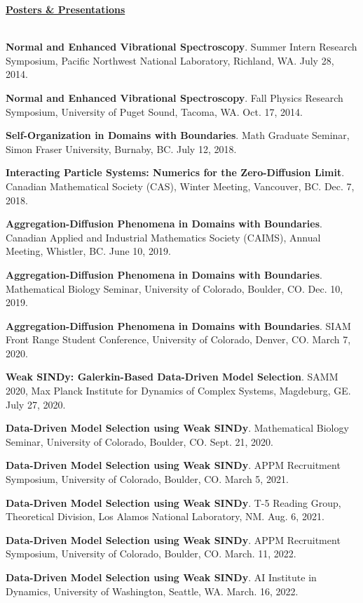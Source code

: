 \documentclass[letterpaper,11pt,oneside]{article}
\newcommand{\headr}[1]{\vspace{10pt}\uline{\Large{\textbf{#1}} \hfill } \\ \vspace{-10pt}\\}
\begin{document}
\headr{Posters \& Presentations}

\begin{enumerate}[label={[\arabic*]}]
\item \textbf{Normal and Enhanced Vibrational Spectroscopy}. Summer Intern Research Symposium, Pacific Northwest National Laboratory, Richland, WA. July 28, 2014.
\item \textbf{Normal and Enhanced Vibrational Spectroscopy}. Fall Physics Research Symposium, University of Puget Sound, Tacoma, WA. Oct. 17, 2014.
\item \textbf{Self-Organization in Domains with Boundaries}. Math Graduate Seminar, Simon Fraser University, Burnaby, BC. July 12, 2018.
\item \textbf{Interacting Particle Systems: Numerics for the Zero-Diffusion Limit}. Canadian Mathematical Society (CAS), Winter Meeting, Vancouver, BC. Dec. 7, 2018.
\item \textbf{Aggregation-Diffusion Phenomena in Domains with Boundaries}. Canadian Applied and Industrial Mathematics Society (CAIMS), Annual Meeting, Whistler, BC. June 10, 2019.
\item \textbf{Aggregation-Diffusion Phenomena in Domains with Boundaries}. Mathematical Biology Seminar, University of Colorado, Boulder, CO. Dec. 10, 2019.
\item \textbf{Aggregation-Diffusion Phenomena in Domains with Boundaries}. SIAM Front Range Student Conference, University of Colorado, Denver, CO. March 7, 2020.
\item \textbf{Weak SINDy: Galerkin-Based Data-Driven Model Selection}. SAMM 2020, Max Planck Institute for Dynamics of Complex Systems, Magdeburg, GE. July 27, 2020.
\item \textbf{Data-Driven Model Selection using Weak SINDy}. Mathematical Biology Seminar, University of Colorado, Boulder, CO. Sept. 21, 2020.
\item \textbf{Data-Driven Model Selection using Weak SINDy}. APPM Recruitment Symposium, University of Colorado, Boulder, CO. March 5, 2021.
\item \textbf{Data-Driven Model Selection using Weak SINDy}. T-5 Reading Group, Theoretical Division, Los Alamos National Laboratory, NM. Aug. 6, 2021.
\item \textbf{Data-Driven Model Selection using Weak SINDy}. APPM Recruitment Symposium, University of Colorado, Boulder, CO. March. 11, 2022.
\item \textbf{Data-Driven Model Selection using Weak SINDy}. AI Institute in Dynamics, University of Washington, Seattle, WA. March. 16, 2022.

\end{enumerate}
\end{document}
